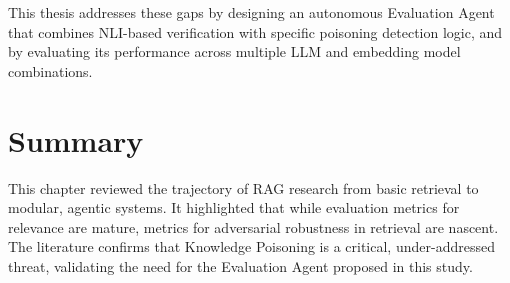 This thesis addresses these gaps by designing an autonomous Evaluation Agent that combines NLI-based verification with specific poisoning detection logic, and by evaluating its performance across multiple LLM and embedding model combinations.

\section{Summary}
This chapter reviewed the trajectory of RAG research from basic retrieval to modular, agentic systems. It highlighted that while evaluation metrics for relevance are mature, metrics for adversarial robustness in retrieval are nascent. The literature confirms that Knowledge Poisoning is a critical, under-addressed threat, validating the need for the Evaluation Agent proposed in this study.